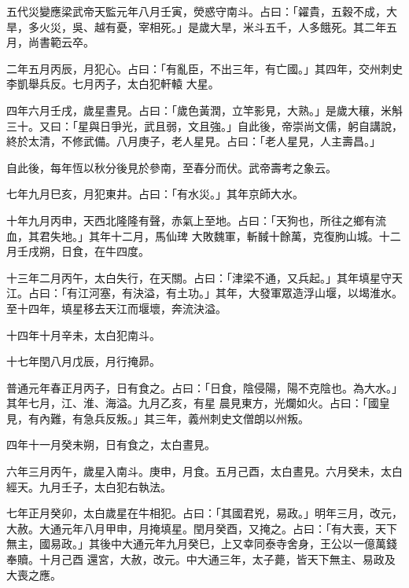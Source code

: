 \begin{pinyinscope}
 五代災變應梁武帝天監元年八月壬寅，熒惑守南斗。占曰：「糴貴，五穀不成，大旱，多火災，吳、越有憂，宰相死。」是歲大旱，米斗五千，人多餓死。其二年五月，尚書範云卒。



 二年五月丙辰，月犯心。占曰：「有亂臣，不出三年，有亡國。」其四年，交州刺史李凱舉兵反。七月丙子，太白犯軒轅
 大星。



 四年六月壬戌，歲星晝見。占曰：「歲色黃潤，立竿影見，大熟。」是歲大穰，米斛三十。又曰：「星與日爭光，武且弱，文且強。」自此後，帝崇尚文儒，躬自講說，終於太清，不修武備。八月庚子，老人星見。占曰：「老人星見，人主壽昌。」



 自此後，每年恆以秋分後見於參南，至春分而伏。武帝壽考之象云。



 七年九月巳亥，月犯東井。占曰：「有水災。」其年京師大水。



 十年九月丙申，天西北隆隆有聲，赤氣上至地。占曰：「天狗也，所往之鄉有流血，其君失地。」其年十二月，馬仙琕
 大敗魏軍，斬馘十餘萬，克復朐山城。十二月壬戌朔，日食，在牛四度。



 十三年二月丙午，太白失行，在天關。占曰：「津梁不通，又兵起。」其年填星守天江。占曰：「有江河塞，有決溢，有土功。」其年，大發軍眾造浮山堰，以堨淮水。至十四年，填星移去天江而堰壞，奔流決溢。



 十四年十月辛未，太白犯南斗。



 十七年閏八月戊辰，月行掩昴。



 普通元年春正月丙子，日有食之。占曰：「日食，陰侵陽，陽不克陰也。為大水。」其年七月，江、淮、海溢。九月乙亥，有星
 晨見東方，光爛如火。占曰：「國皇見，有內難，有急兵反叛。」其三年，義州刺史文僧朗以州叛。



 四年十一月癸未朔，日有食之，太白晝見。



 六年三月丙午，歲星入南斗。庚申，月食。五月己酉，太白晝見。六月癸未，太白經天。九月壬子，太白犯右執法。



 七年正月癸卯，太白歲星在牛相犯。占曰：「其國君兇，易政。」明年三月，改元，大赦。大通元年八月甲申，月掩填星。閏月癸酉，又掩之。占曰：「有大喪，天下無主，國易政。」其後中大通元年九月癸巳，上又幸同泰寺舍身，王公以一億萬錢奉贖。十月己酉
 還宮，大赦，改元。中大通三年，太子薨，皆天下無主、易政及大喪之應。




\end{pinyinscope}
